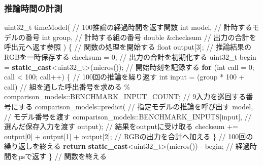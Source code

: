 \documentclass[
  10pt,
  a4paper,
]{article}
\newenvironment{Shaded}{}{}
\newcommand{\CommentTok}[1]{\textcolor[rgb]{0.38,0.63,0.69}{\textit{#1}}}
\newcommand{\ControlFlowTok}[1]{\textcolor[rgb]{0.00,0.44,0.13}{\textbf{#1}}}
\newcommand{\DataTypeTok}[1]{\textcolor[rgb]{0.56,0.13,0.00}{#1}}
\newcommand{\DecValTok}[1]{\textcolor[rgb]{0.25,0.63,0.44}{#1}}
\newcommand{\KeywordTok}[1]{\textcolor[rgb]{0.00,0.44,0.13}{\textbf{#1}}}
\newcommand{\NormalTok}[1]{#1}
\newcommand{\OperatorTok}[1]{\textcolor[rgb]{0.40,0.40,0.40}{#1}}
\renewcommand{\CommentTok}[1]{\textcolor[rgb]{0.25,0.25,0.25}{#1}}
\begin{document}

\subsubsection{推論時間の計測}\label{ux63a8ux8ad6ux6642ux9593ux306eux8a08ux6e2c}

\begin{Shaded}
\begin{Highlighting}[]
\DataTypeTok{uint32\_t}\NormalTok{ timeModel}\OperatorTok{(} \CommentTok{// 100推論の経過時間を返す関数}
  \DataTypeTok{int}\NormalTok{ model}\OperatorTok{,} \CommentTok{// 計時するモデルの番号}
  \DataTypeTok{int}\NormalTok{ group}\OperatorTok{,} \CommentTok{// 計時する組の番号}
  \DataTypeTok{double} \OperatorTok{\&}\NormalTok{checksum }\CommentTok{// 出力の合計を呼出元へ返す参照}
\OperatorTok{)} \OperatorTok{\{} \CommentTok{// 関数の処理を開始する}
  \DataTypeTok{float}\NormalTok{ output}\OperatorTok{[}\DecValTok{3}\OperatorTok{];} \CommentTok{// 推論結果のRGBを一時保存する}
\NormalTok{  checksum }\OperatorTok{=} \DecValTok{0}\OperatorTok{;} \CommentTok{// 出力の合計を初期化する}
  \DataTypeTok{uint32\_t}\NormalTok{ begin }\OperatorTok{=} \KeywordTok{static\_cast}\OperatorTok{\textless{}}\DataTypeTok{uint32\_t}\OperatorTok{\textgreater{}(}\NormalTok{micros}\OperatorTok{());} \CommentTok{// 開始時刻を記録する}
  \ControlFlowTok{for} \OperatorTok{(}\DataTypeTok{int}\NormalTok{ call }\OperatorTok{=} \DecValTok{0}\OperatorTok{;}\NormalTok{ call }\OperatorTok{\textless{}} \DecValTok{100}\OperatorTok{;}\NormalTok{ call}\OperatorTok{++)} \OperatorTok{\{} \CommentTok{// 100回の推論を繰り返す}
    \DataTypeTok{int}\NormalTok{ input }\OperatorTok{=} \OperatorTok{(}\NormalTok{group }\OperatorTok{*} \DecValTok{100} \OperatorTok{+}\NormalTok{ call}\OperatorTok{)} \CommentTok{// 組を通した呼出番号を求める}
      \OperatorTok{\%}\NormalTok{ comparison\_models}\OperatorTok{::}\NormalTok{BENCHMARK\_INPUT\_COUNT}\OperatorTok{;} \CommentTok{// 9入力を巡回する番号にする}
\NormalTok{    comparison\_models}\OperatorTok{::}\NormalTok{predict}\OperatorTok{(} \CommentTok{// 指定モデルの推論を呼び出す}
\NormalTok{      model}\OperatorTok{,} \CommentTok{// モデル番号を渡す}
\NormalTok{      comparison\_models}\OperatorTok{::}\NormalTok{BENCHMARK\_INPUTS}\OperatorTok{[}\NormalTok{input}\OperatorTok{],} \CommentTok{// 選んだ保存入力を渡す}
\NormalTok{      output}\OperatorTok{);} \CommentTok{// 結果をoutputに受け取る}
\NormalTok{    checksum }\OperatorTok{+=}\NormalTok{ output}\OperatorTok{[}\DecValTok{0}\OperatorTok{]} \OperatorTok{+}\NormalTok{ output}\OperatorTok{[}\DecValTok{1}\OperatorTok{]} \OperatorTok{+}\NormalTok{ output}\OperatorTok{[}\DecValTok{2}\OperatorTok{];} \CommentTok{// RGBの出力を合計へ加える}
  \OperatorTok{\}} \CommentTok{// 100回の繰り返しを終える}
  \ControlFlowTok{return} \KeywordTok{static\_cast}\OperatorTok{\textless{}}\DataTypeTok{uint32\_t}\OperatorTok{\textgreater{}(}\NormalTok{micros}\OperatorTok{())} \OperatorTok{{-}}\NormalTok{ begin}\OperatorTok{;} \CommentTok{// 経過時間をµsで返す}
\OperatorTok{\}} \CommentTok{// 関数を終える}
\end{Highlighting}
\end{Shaded}
\end{document}
